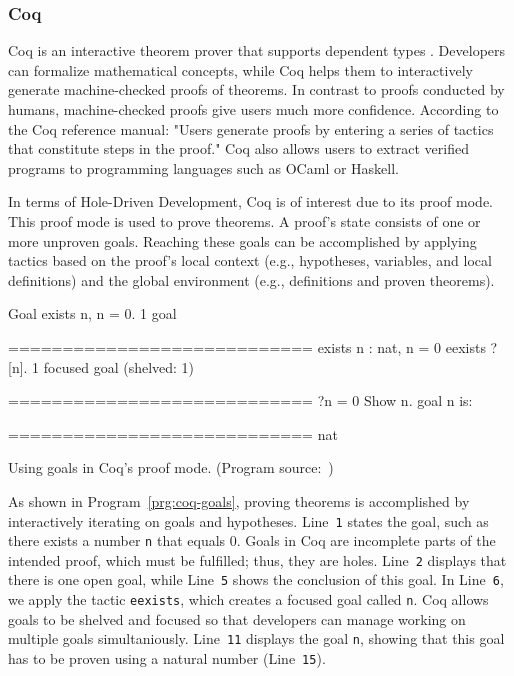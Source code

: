 \subsubsection{Coq}
Coq is an interactive theorem prover that supports dependent types \cite{the_coq_development_team_proof_2023}.
Developers can formalize mathematical concepts, while Coq helps them to interactively generate machine-checked proofs of theorems.
In contrast to proofs conducted by humans, machine-checked proofs give users much more confidence.
According to the Coq reference manual: "Users generate proofs by entering a series of tactics that constitute steps in the proof." \cite{the_coq_development_team_proof_2023}
Coq also allows users to extract verified programs to programming languages such as OCaml or Haskell.

In terms of Hole-Driven Development, Coq is of interest due to its proof mode.
This proof mode is used to prove theorems.
A proof's state consists of one or more unproven goals.
Reaching these goals can be accomplished by applying tactics \cite{redmon_coq_2021} based on the proof's local context (e.g., hypotheses, variables, and local definitions) and the global environment (e.g., definitions and proven theorems).

\begin{program}[ht]
\begin{GenericCode}
Goal exists n, n = 0.
    1 goal
      
      ============================
      exists n : nat, n = 0
eexists ?[n].
    1 focused goal (shelved: 1)
      
      ============================
      ?n = 0
Show n.
    goal n is:
      
      ============================
      nat
\end{GenericCode}
\caption{Using goals in Coq's proof mode. (Program source:~\cite{the_coq_development_team_proof_2023})}
\label{prg:coq-goals}
\end{program}

As shown in Program~\ref{prg:coq-goals}, proving theorems is accomplished by interactively iterating on goals and hypotheses.
Line~\verb|1| states the goal, such as there exists a number \verb|n| that equals 0.
Goals in Coq are incomplete parts of the intended proof, which must be fulfilled; thus, they are holes.
Line~\verb|2| displays that there is one open goal, while Line~\verb|5| shows the conclusion of this goal.
In Line~\verb|6|, we apply the tactic \verb|eexists|, which creates a focused goal called \verb|n|.
Coq allows goals to be shelved and focused so that developers can manage working on multiple goals simultaniously.
Line~\verb|11| displays the goal \verb|n|, showing that this goal has to be proven using a natural number (Line~\verb|15|).

